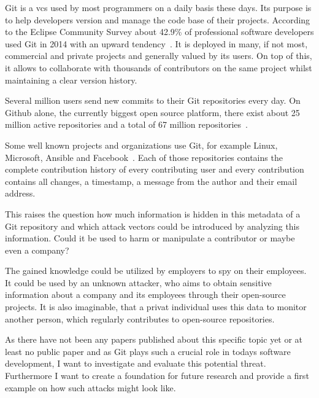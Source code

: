 Git is a \ac{vcs} used by most programmers on a daily basis these days.
Its purpose is to help developers version and manage the code base of their projects.
According to the Eclipse Community Survey about 42.9\% of professional software developers used Git in 2014 with an upward tendency~\cite{article:git-popularity}.
It is deployed in many, if not most, commercial and private projects and generally valued by its users.
On top of this, it allows to collaborate with thousands of contributors on the same project whilst maintaining a clear version history.

Several million users send new commits to their Git repositories every day.
On Github alone, the currently biggest open source platform, there exist about 25 million active repositories and a total of 67 million repositories~\cite{article:github-statistics}.

Some well known projects and organizations use Git, for example Linux, Microsoft, Ansible and Facebook~\cite{article:github-statistics}.
Each of those repositories contains the complete contribution history of every contributing user and every contribution contains all changes, a timestamp, a message from the author and their email address.

This raises the question how much information is hidden in this metadata of a Git repository and which attack vectors could be introduced by analyzing this information.
Could it be used to harm or manipulate a contributor or maybe even a company?

The gained knowledge could be utilized by employers to spy on their employees.
It could be used by an unknown attacker, who aims to obtain sensitive information about a company and its employees through their open-source projects.
It is also imaginable, that a privat individual uses this data to monitor another person, which regularly contributes to open-source repositories.

As there have not been any papers published about this specific topic yet or at least no public paper and as Git plays such a crucial role in todays software development, I want to investigate and evaluate this potential threat.
Furthermore I want to create a foundation for future research and provide a first example on how such attacks might look like.

